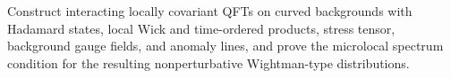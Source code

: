 \begin{openproblem}
\label{op:interacting-microlocal-spectrum-condition}
Construct interacting locally covariant QFTs on curved backgrounds with
Hadamard states, local Wick and time-ordered products, stress tensor,
background gauge fields, and anomaly lines, and prove the microlocal spectrum
condition for the resulting nonperturbative Wightman-type distributions.
\end{openproblem}
